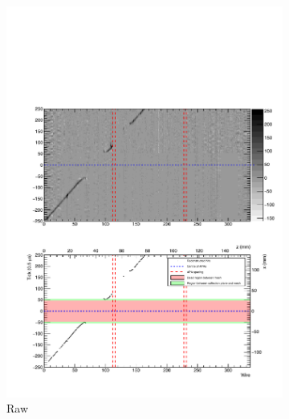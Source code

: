 \begin{figure}
  \centering
  \begin{subfigure}[t]{0.9\linewidth}
    \centering
    \includegraphics[width=\textwidth]{evd_hook_raw.pdf}
    \caption{Raw}
    \label{fig:EVDHookRaw}
  \end{subfigure}
  \begin{subfigure}[t]{0.9\linewidth}
    \vspace{0.5cm}
    \centering

\end{subfigure}
\end{figure}
